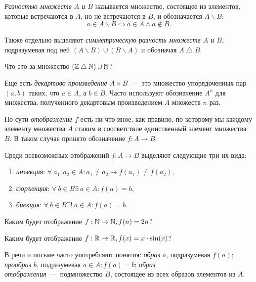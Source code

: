 	\emph{Разностью множеств $A$ и $B$} называется множество, состоящее из элементов, которые встречаются в $A$, 
	но не встречаются в $B$, и обозначается $A \backslash B$:
	$$a \in A \backslash B \Leftrightarrow a \in A \wedge a \notin B.$$
	
	Также отдельно выделяют \emph{симметрическую разность множеств $A$ и $B$}, подразумевая под ней 
	$(A \backslash B) \cup (B \backslash A)$ и обозначая $A \bigtriangleup B$.
	
\begin{testquestion}
	Что это за множество $(\mathbb{Z} \bigtriangleup \mathbb{N}) \cup \mathbb{N}$?
\end{testquestion}

	Еще есть \emph{декартово произведение $A \times B$}~---~это множество упорядоченных пар $(a, b)$ таких, 
	что $a \in A$, а $b \in B$. Часто используют обозначение $A^n$ для множества, полученного декартовым произведением $A$ множеств $n$ раз.
	
	
	По сути \emph{отображение $f$} есть ни что иное, как правило, по которому мы каждому элементу множества $A$ ставим в 
	соответствие единственный элемент множества $B$. В таком случае принято обозначение $f: A \to B$.
	
	Среди всевозможных отображений $f: A \to B$ выделяют следующие три их вида:

\begin{enumerate}
	\item \emph{инъекция}: $\forall \!\ a_1, a_2 \in A \colon a_1 \neq a_2 \mapsto f(a_1) \neq f(a_2)$,
	\item \emph{сюръекция}: $\forall \!\ b \in B \exists \!\ a \in A \colon f(a) = b$,
	\item \emph{биекция}: $\forall \!\ b \in B \exists! \!\ a \in A \colon f(a) = b$.
\end{enumerate}

\begin{testquestion}
	Каким будет отображение $f: \mathbb{N} \to \mathbb{N}, f(n) = 2n$?
\end{testquestion}

\begin{testquestion}
	Каким будет отображение $f: \mathbb{R} \to \mathbb{R}, f(x) = x \cdot \sin(x)$?
\end{testquestion}

	В речи и письме часто употребляют понятия: \emph{образ} $a$, подразумевая $f(a)$; \emph{прообраз} $b$, 
	подразумевая $a \in A \colon f(a) = b$; \emph{образ отображения}~---~подмножество $B$, состоящее из всех образов элементов из $A$.
	
